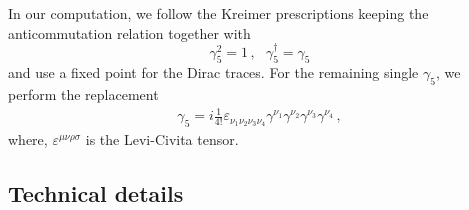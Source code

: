 \documentclass[a4paper]{jpconf}
\begin{document}
In our computation, we follow the Kreimer prescriptions keeping the anticommutation relation together with 
\begin{equation}
 \gamma_5^2 = 1 \,,  ~~~ \gamma_5^{\dag} = \gamma_5
\end{equation}
and use a fixed point for the Dirac traces.
% 
For the remaining single $\gamma_5$, we perform the replacement
%
\begin{align}
  \gamma_5 = i \frac{1}{4!} \varepsilon_{\nu_1 \nu_2 \nu_3 \nu_4}
  \gamma^{\nu_1}  \gamma^{\nu_2} \gamma^{\nu_3} \gamma^{\nu_4} \,,
\end{align}
%
where, $\varepsilon^{\mu\nu\rho\sigma}$ is the Levi-Civita tensor.


\subsection{Technical details}
\label{sec:tech}
\end{document}
